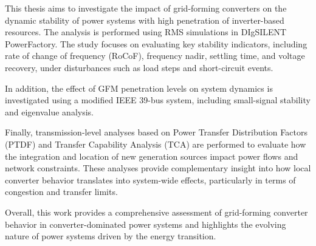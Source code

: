 This thesis aims to investigate the impact of grid-forming converters on the dynamic stability of power systems with high penetration of inverter-based resources. The analysis is performed using RMS simulations in DIgSILENT PowerFactory. The study focuses on evaluating key stability indicators, including rate of change of frequency (RoCoF), frequency nadir, settling time, and voltage recovery, under disturbances such as load steps and short-circuit events.

In addition, the effect of GFM penetration levels on system dynamics is investigated using a modified IEEE 39-bus system, including small-signal stability and eigenvalue analysis.

Finally, transmission-level analyses based on Power Transfer Distribution Factors (PTDF) and Transfer Capability Analysis (TCA) are performed to evaluate how the integration and location of new generation sources impact power flows and network constraints. These analyses provide complementary insight into how local converter behavior translates into system-wide effects, particularly in terms of congestion and transfer limits.

Overall, this work provides a comprehensive assessment of grid-forming converter behavior in converter-dominated power systems and highlights the evolving nature of power systems driven by the energy transition.





